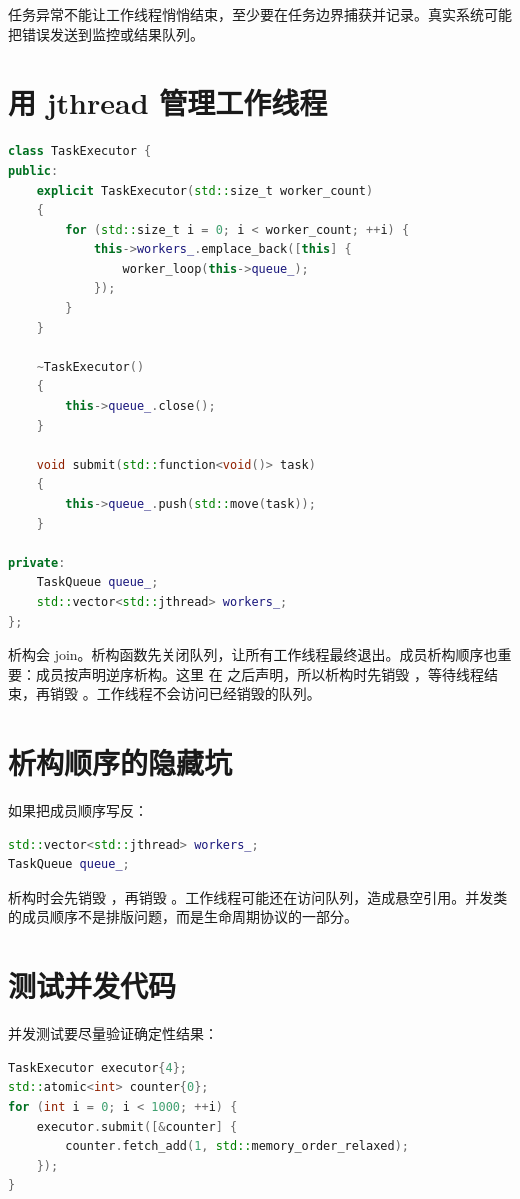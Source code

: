 任务异常不能让工作线程悄悄结束，至少要在任务边界捕获并记录。真实系统可能把错误发送到监控或结果队列。

\section{用 jthread 管理工作线程}

\begin{lstlisting}[language=C++,caption={小型任务执行器}]
class TaskExecutor {
public:
    explicit TaskExecutor(std::size_t worker_count)
    {
        for (std::size_t i = 0; i < worker_count; ++i) {
            this->workers_.emplace_back([this] {
                worker_loop(this->queue_);
            });
        }
    }

    ~TaskExecutor()
    {
        this->queue_.close();
    }

    void submit(std::function<void()> task)
    {
        this->queue_.push(std::move(task));
    }

private:
    TaskQueue queue_;
    std::vector<std::jthread> workers_;
};
\end{lstlisting}

 析构会 join。析构函数先关闭队列，让所有工作线程最终退出。成员析构顺序也重要：成员按声明逆序析构。这里  在  之后声明，所以析构时先销毁 ，等待线程结束，再销毁 。工作线程不会访问已经销毁的队列。

\section{析构顺序的隐藏坑}

如果把成员顺序写反：

\begin{lstlisting}[language=C++,caption={危险的成员顺序}]
std::vector<std::jthread> workers_;
TaskQueue queue_;
\end{lstlisting}

析构时会先销毁 ，再销毁 。工作线程可能还在访问队列，造成悬空引用。并发类的成员顺序不是排版问题，而是生命周期协议的一部分。

\section{测试并发代码}

并发测试要尽量验证确定性结果：

\begin{lstlisting}[language=C++,caption={任务执行器测试思路}]
TaskExecutor executor{4};
std::atomic<int> counter{0};
for (int i = 0; i < 1000; ++i) {
    executor.submit([&counter] {
        counter.fetch_add(1, std::memory_order_relaxed);
    });
}
\end{lstlisting}

